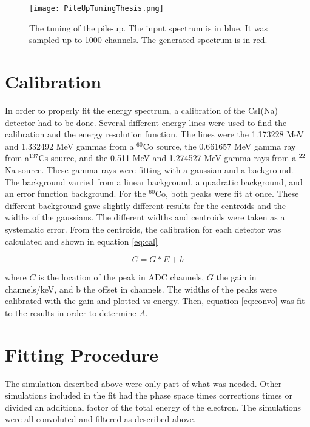\begin{figure}[!htb]
	\centerline{\texttt{[image: PileUpTuningThesis.png]}}
	\caption{The tuning of the pile-up.
		 The input spectrum is in blue.
		 It was sampled up to 1000 channels.
		 The generated spectrum is in red.}
	\label{fig:pileuptune}
\end{figure}

\section{Calibration}
In order to properly fit the energy spectrum, a calibration of the CsI(Na) detector had to be done.
Several different energy lines were used to find the calibration and the energy resolution function.
The lines were the 1.173228 MeV and 1.332492 MeV gammas from a $^{60}$Co source, the 0.661657 MeV gamma ray from a$^{137}$Cs source, and the 0.511 MeV and 1.274527 MeV gamma rays from a $^{22}$Na source.
These gamma rays were fitting with a gaussian and a background.
The background varried from a linear background, a quadratic background, and an error function background.
For the $^{60}$Co, both peaks were fit at once.
These different background gave slightly different results for the centroids and the widths of the gaussians.
The different widths and centroids were taken as a systematic error.
From the centroids, the calibration for each detector was calculated and shown in equation \ref{eq:cal}

\begin{equation}
	C = G * E + b
	\label{eq:cal}
\end{equation}

where $C$ is the location of the peak in ADC channels, $G$ the gain in channels/keV, and b the offset in channels.
The widths of the peaks were calibrated with the gain and plotted vs energy.
Then, equation \ref{eq:convo} was fit to the results in order to determine $A$.

\section{Fitting Procedure}
The simulation described above were only part of what was needed.
Other simulations included in the fit had the phase space times corrections times or divided an additional factor of the total energy of the electron.
The simulations were all convoluted and filtered as described above.

